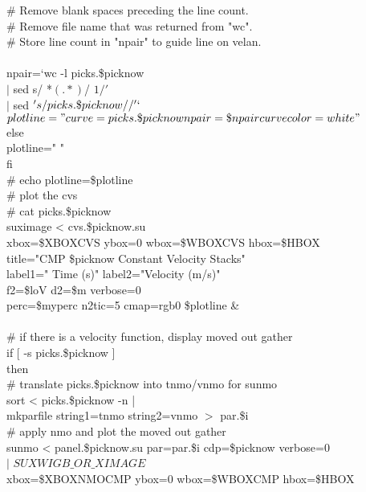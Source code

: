       \#   Remove blank spaces preceding the line count. \\
      \# Remove file name that was returned from "wc". \\
      \# Store line count in "npair" to guide line on velan. \\
 \\
      npair=`wc -l picks.\$picknow \ \\
            $|$ sed  s/  *$(.*)$/ $1/'$  \ \\
             $|$ sed $'s/picks.\$picknow//' `$ \\
     $ plotline="curve=picks.\$picknow npair=\$npair curvecolor=white"$ \\
    else \\
      plotline=" " \\
    fi \\
    \# echo plotline=\$plotline \\
    \# plot the cvs \\
    \# cat picks.\$picknow \\
    suximage < cvs.\$picknow.su \ \\
	xbox=\$XBOXCVS ybox=0 wbox=\$WBOXCVS hbox=\$HBOX \ \\
        title="CMP \$picknow Constant Velocity Stacks" \ \\
        label1=" Time (s)" label2="Velocity (m/s)" \ \\
        f2=\$loV d2=\$m verbose=0 \ \\
        perc=\$myperc n2tic=5 cmap=rgb0  \$plotline \& \\
 \\
    \# if there is a velocity function, display moved out gather \\
    if [ -s picks.\$picknow ] \\
    then \\
      \# translate picks.\$picknow into tnmo/vnmo for sunmo \\
      sort < picks.\$picknow -n | \\
         mkparfile string1=tnmo string2=vnmo $>$ par.\$i \\
      \# apply nmo and plot the moved out gather \\
      sunmo < panel.\$picknow.su par=par.\$i cdp=\$picknow verbose=0 \ \\
      $|$ $SUXWIGB\_OR\_XIMAGE$  \ \\
         xbox=\$XBOXNMOCMP ybox=0 wbox=\$WBOXCMP hbox=\$HBOX \ \\
